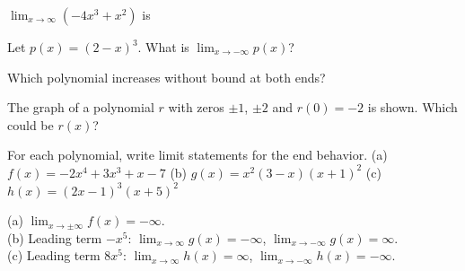 \begin{exo}{}
$\displaystyle\lim_{x\to\infty}\left(-4x^3+x^2\right)$ is
\end{exo}
\begin{exo}{}
Let $p(x)=(2-x)^3$. What is $\displaystyle\lim_{x\to-\infty}p(x)$?
\end{exo}
\begin{exo}{}
Which polynomial increases without bound at both ends?
\end{exo}
\begin{exo}{}
The graph of a polynomial $r$ with zeros $\pm1$, $\pm2$ and $r(0)=-2$ is shown. Which could be $r(x)$?
\end{exo}
\begin{exo}{}
For each polynomial, write limit statements for the end behavior.
(a) $f(x)=-2x^4+3x^3+x-7$ \quad (b) $g(x)=x^2(3-x)(x+1)^2$ \quad (c) $h(x)=(2x-1)^3(x+5)^2$
\begin{solution}
(a) $\lim_{x\to\pm\infty}f(x)=-\infty$.\\
(b) Leading term $-x^5$: $\lim_{x\to\infty}g(x)=-\infty$, $\lim_{x\to-\infty}g(x)=\infty$.\\
(c) Leading term $8x^5$: $\lim_{x\to\infty}h(x)=\infty$, $\lim_{x\to-\infty}h(x)=-\infty$.
\end{solution}
\end{exo}

